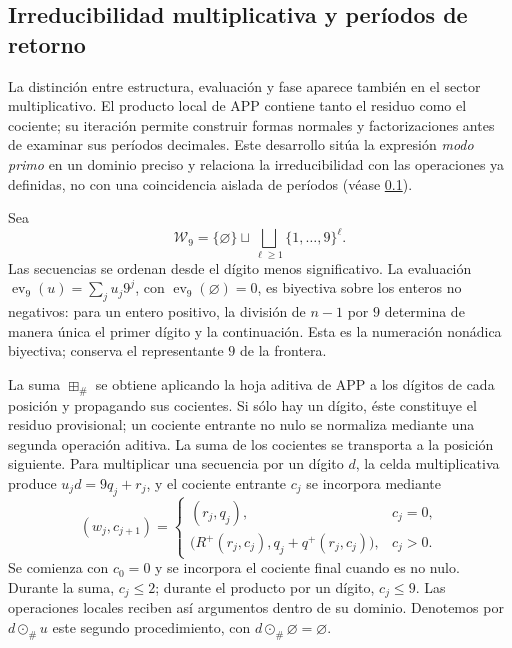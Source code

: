\subsection{Irreducibilidad multiplicativa y períodos de retorno}
\label{primos-retornos}

La distinción entre estructura, evaluación y fase aparece también en el
sector multiplicativo. El producto local de APP contiene tanto el residuo
como el cociente; su iteración permite construir formas normales y
factorizaciones antes de examinar sus períodos decimales. Este desarrollo
sitúa la expresión \emph{modo primo} en un dominio preciso y relaciona la
irreducibilidad con las operaciones ya definidas, no con una coincidencia
aislada de períodos (véase \ref{primos-retornos}).

Sea
\[
 \mathcal W_9=\{\varnothing\}\sqcup
 \bigsqcup_{\ell\geq1}\{1,\ldots,9\}^{\ell}.
\]
Las secuencias se ordenan desde el dígito menos significativo. La evaluación
\(\operatorname{ev}_9(u)=\sum_j u_j9^j\), con
\(\operatorname{ev}_9(\varnothing)=0\), es biyectiva sobre los enteros no
negativos: para un entero positivo, la división de \(n-1\) por \(9\)
determina de manera única el primer dígito y la continuación. Esta es la
numeración nonádica biyectiva; conserva el representante \(9\) de la
frontera.

La suma \(\boxplus_\#\) se obtiene aplicando la hoja aditiva de APP a los
dígitos de cada posición y propagando sus cocientes. Si sólo hay un dígito,
éste constituye el residuo provisional; un cociente entrante no nulo se
normaliza mediante una segunda operación aditiva. La suma de los
cocientes se transporta a la posición siguiente. Para multiplicar una
secuencia por un dígito \(d\), la celda multiplicativa produce
\(u_jd=9q_j+r_j\), y el cociente entrante \(c_j\) se incorpora mediante
\[
 (w_j,c_{j+1})=
 \begin{cases}
 (r_j,q_j),&c_j=0,\\
 \bigl(R^+(r_j,c_j),q_j+q^+(r_j,c_j)\bigr),&c_j>0.
 \end{cases}
\]
Se comienza con \(c_0=0\) y se incorpora el cociente final cuando es no
nulo. Durante la suma, \(c_j\leq2\); durante el producto por un dígito,
\(c_j\leq9\). Las operaciones locales reciben así argumentos dentro
de su dominio. Denotemos por \(d\odot_\#u\) este segundo procedimiento,
con \(d\odot_\#\varnothing=\varnothing\).

